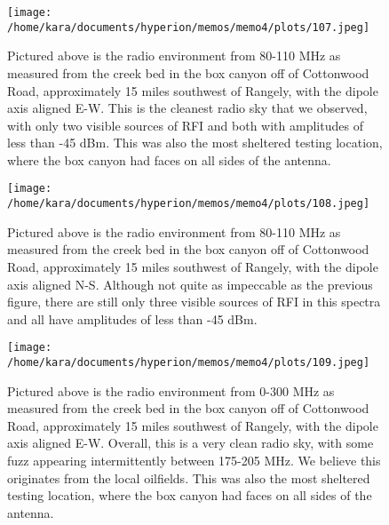 \documentclass[11pt]{article}
\begin{document}
\begin{figure}[H]
    \begin{center}
    \texttt{[image: /home/kara/documents/hyperion/memos/memo4/plots/107.jpeg]}
    \end{center}
    \caption{
        Pictured above is the radio environment from 80-110 MHz as measured 
        from the creek bed in the box canyon off of Cottonwood Road, 
        approximately 15 miles southwest of Rangely, with the dipole axis 
        aligned E-W.  This is the cleanest radio sky that we observed, with 
        only two visible sources of RFI and both with amplitudes of less than 
        -45 dBm.  This was also the most sheltered testing location, where the 
        box canyon had faces on all sides of the antenna.
    }
    \label{fig:107}
\end{figure}

\begin{figure}[H]
    \begin{center}
    \texttt{[image: /home/kara/documents/hyperion/memos/memo4/plots/108.jpeg]}
    \end{center}
    \caption{
        Pictured above is the radio environment from 80-110 MHz as measured 
        from the creek bed in the box canyon off of Cottonwood Road, 
        approximately 15 miles southwest of Rangely, with the dipole axis 
        aligned N-S.  Although not quite as impeccable as the previous figure, 
        there are still only three visible sources of RFI in this spectra and 
        all have amplitudes of less than -45 dBm.
    }
    \label{fig:108}
\end{figure}

\begin{figure}[H]
    \begin{center}
    \texttt{[image: /home/kara/documents/hyperion/memos/memo4/plots/109.jpeg]}
    \end{center}
    \caption{
        Pictured above is the radio environment from 0-300 MHz as measured from 
        the creek bed in the box canyon off of Cottonwood Road, approximately 
        15 miles southwest of Rangely, with the dipole axis aligned E-W.  
           Overall, this is a very clean radio sky, with some fuzz appearing 
           intermittently between 175-205 MHz. We believe this originates from 
           the local oilfields. This was also the most sheltered testing 
           location, where the box canyon had faces on all sides of the 
           antenna.
    }
    \label{fig:109}
\end{figure}
\end{document}
